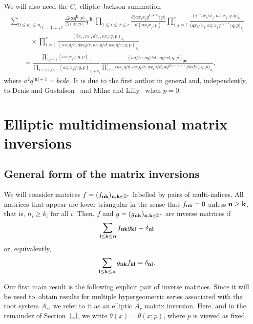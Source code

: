 \documentclass[pdftex]{sigma}%
\numberwithin{equation}{section}
\def\ta{\theta}
\begin{document}
We will also need the $C_r$ elliptic Jackson summation
\begin{gather}
\underset{i=1,\dots,r}{\sum_{0\le k_i\le n_i}}
\frac{\Delta\big(\mathbf x q^{\mathbf k};p\big)}{\Delta(\mathbf x;p)}q^{|\mathbf k|}
\prod\limits_{1\le i\le j\le r}\frac{\ta\big(ax_ix_jq^{k_i+k_j};p\big)}{\ta(ax_ix_j;p)}
\prod\limits_{i,j=1}^r\frac{\big(q^{-n_j}x_i/x_j,ax_ix_j;q,p\big)_{k_i}}
{\big(qx_i/x_j,ax_ix_jq^{n_j+1};q,p\big)_{k_i}}\nonumber
\\ \qquad\quad{}
\times
\prod\limits_{i=1}^r\frac{(bx_i,cx_i,dx_i,ex_i;q,p)_{k_i}}
{(ax_iq/b,ax_iq/c,ax_iq/d,ax_iq/e;q,p)_{k_i}}\nonumber
\\ \qquad{}
=\frac{\prod\limits_{i,j=1}^r(ax_ix_jq;q,p)_{n_i}}{\prod\limits_{1\le i<j\le r}\!(ax_ix_jq;q,p)_{n_i+n_j}}\frac{(aq/bc,aq/bd,aq/cd;q,p)_{|\mathbf n|}}
{\prod\limits_{i=1} ^r\!\big(ax_iq/b,ax_iq/c,ax_iq/d,aq^{|\mathbf n|-n_i+1}/bcdx_i;q,p\big)_{n_i}},\!\!
\label{cr87gl}
\end{gather}
where $a^2q^{|\mathbf n|+1}=bcde$. It is
due to the first author \cite[Corollary~5.3]{r} in general and, independently, to
Denis and Gustafson~\cite{dg} and
Milne and Lilly~\cite{ml2} when $p=0$.


\section{Elliptic multidimensional matrix inversions}\label{mis}


\subsection{General form of the matrix inversions}
\label{gmis}


We will consider matrices
 $f=(f_{\bf nk})_{{\bf n}, {\bf k}\in\mathbb Z^r}$
labelled by pairs of multi-indices. All matrices that appear are
lower-triangular in the sense that $f_{\bf nk}=0$ unless $\bf
n\geq\bf k$, that is, $n_i\geq k_i$ for all $i$. Then,
$f$ and $g=(g_{\bf nk})_{{\bf n}, {\bf k}\in\mathbb Z^r}$
are inverse matrices if
\begin{gather}\label{fg}
\sum_{\bf l\leq k\leq n}f_{\bf nk}g_{\bf kl}=\delta_{\bf nl} \end{gather}
or, equivalently,
\begin{gather*}
\sum_{\bf l\leq k\leq n}g_{\bf nk}f_{\bf kl}=\delta_{\bf nl}.
\end{gather*}

Our first main result is the following explicit pair of
 inverse matrices. Since it will be used to~obtain results for multiple hypergeometric series associated with the root system $A_r$, we refer to it as an
 elliptic $A_r$ matrix inversion. Here, and in the remainder of Section~\ref{gmis}, we write
 $\theta(x)=\theta(x;p)$, where $p$ is viewed as fixed.
\end{document}

